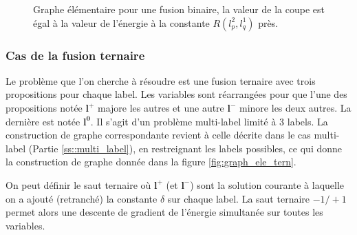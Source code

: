 \documentclass[../main/These_Mathias_Paget.tex]{subfiles}
\begin{document}
\begin{figure}[h]
\begin{center}
\end{center}
\caption{Graphe élémentaire pour une fusion binaire, la valeur de la coupe est égal à la valeur de l’énergie à la constante $R(l^{2}_p,l^{1}_q)$ près.}
\label{fig:graph_elem_fusion}
\end{figure}

\subsubsection{Cas de la fusion ternaire}
	Le problème que l'on cherche à résoudre est une fusion ternaire avec trois propositions pour chaque label. Les variables sont réarrangées pour que l'une des propositions notée $\boldsymbol{l^+}$ majore les autres et une autre $\boldsymbol{l^-}$ minore les deux autres. La dernière est notée $\boldsymbol{l^0}$. Il s'agit d'un problème multi-label limité à 3 labels. La construction de graphe correspondante revient à celle décrite dans le cas multi-label (Partie \ref{ss::multi_label}), en restreignant les labels possibles, ce qui donne la construction de graphe donnée dans la figure \ref{fig:graph_ele_tern}.

On peut définir le saut ternaire où $\boldsymbol{l^+}$ (et $\boldsymbol{l^-}$) sont la solution courante à laquelle on a ajouté (retranché) la constante $\delta$ sur chaque label. La saut ternaire $-1/+1$ permet alors une descente de gradient de l’énergie simultanée sur toutes les variables.
\end{document}
